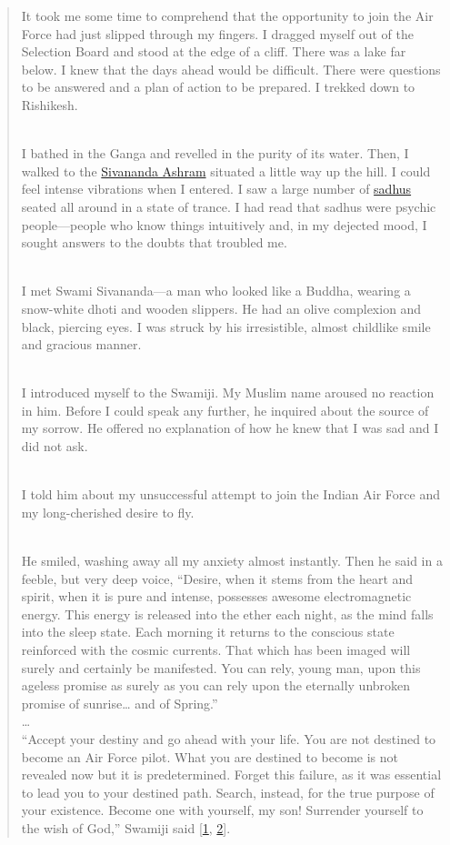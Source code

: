 \documentclass[
  a4paper,
]{article}
\begin{document}
\begin{quote}
It took me some time to comprehend that the opportunity to join the Air
Force had just slipped through my fingers. I dragged myself out of the
Selection Board and stood at the edge of a cliff. There was a lake far
below. I knew that the days ahead would be difficult. There were
questions to be answered and a plan of action to be prepared. I trekked
down to Rishikesh.\\
\strut \\
I bathed in the Ganga and revelled in the purity of its water. Then, I
walked to the
\href{https://en.wikipedia.org/wiki/Divine_Life_Society}{Sivananda
Ashram} situated a little way up the hill. I could feel intense
vibrations when I entered. I saw a large number of
\href{https://en.wikipedia.org/wiki/Sadhu}{sadhus} seated all around in
a state of trance. I had read that sadhus were psychic people---people
who know things intuitively and, in my dejected mood, I sought answers
to the doubts that troubled me.\\
\strut \\
I met Swami Sivananda---a man who looked like a Buddha, wearing a
snow-white dhoti and wooden slippers. He had an olive complexion and
black, piercing eyes. I was struck by his irresistible, almost childlike
smile and gracious manner.\\
\strut \\
I introduced myself to the Swamiji. My Muslim name aroused no reaction
in him. Before I could speak any further, he inquired about the source
of my sorrow. He offered no explanation of how he knew that I was sad
and I did not ask.\\
\strut \\
I told him about my unsuccessful attempt to join the Indian Air Force
and my long-cherished desire to fly.\\
\strut \\
He smiled, washing away all my anxiety almost instantly. Then he said in
a feeble, but very deep voice, ``Desire, when it stems from the heart
and spirit, when it is pure and intense, possesses awesome
electromagnetic energy. This energy is released into the ether each
night, as the mind falls into the sleep state. Each morning it returns
to the conscious state reinforced with the cosmic currents. That which
has been imaged will surely and certainly be manifested. You can rely,
young man, upon this ageless promise as surely as you can rely upon the
eternally unbroken promise of sunrise\ldots{} and of Spring.''\\
\ldots{}\\
``Accept your destiny and go ahead with your life. You are not destined
to become an Air Force pilot. What you are destined to become is not
revealed now but it is predetermined. Forget this failure, as it was
essential to lead you to your destined path. Search, instead, for the
true purpose of your existence. Become one with yourself, my son!
Surrender yourself to the wish of God,'' Swamiji said
{[}\protect\hyperlink{ref-kalam-wof-1999}{1},
\protect\hyperlink{ref-kalam-wof-online}{2}{]}.
\end{quote}
\end{document}
